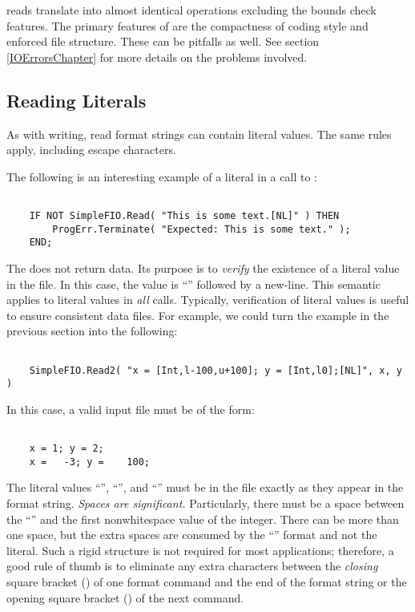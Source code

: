  reads translate into almost identical 
 operations excluding the bounds check features.
The primary features of  are the compactness of
coding style and enforced file structure.  These can be pitfalls as well.
See section \ref{IOErrorsChapter} for more details on the problems involved.

\subsection{Reading Literals}


As with writing, read format strings can contain literal values.
The same rules apply, including escape characters. 

The following is an interesting example of a literal in a call
to :
\begin{verbatim}

    IF NOT SimpleFIO.Read( "This is some text.[NL]" ) THEN
        ProgErr.Terminate( "Expected: This is some text." );
    END;

\end{verbatim}
The  does not return data.  Its purpose is to
{\em verify} the existence of a literal value in the file.  In
this case, the value is ``'' followed by
a new-line.  This semantic applies to literal values in {\em all}
 calls.  Typically, verification of literal values
is useful to ensure consistent data files.  For example, we could
turn the example in the previous section into the following:
\begin{verbatim}

    SimpleFIO.Read2( "x = [Int,l-100,u+100]; y = [Int,l0];[NL]", x, y )

\end{verbatim}
In this case, a valid input file must be of the form:
\begin{verbatim}

    x = 1; y = 2;
    x =   -3; y =    100;

\end{verbatim}
The literal values ``'', ``'', and ``\code{;}''
must be in the file exactly as they appear in the format string.
{\em Spaces are significant.}  Particularly, there must be a space
between the ``\code{=}'' and the first non\-white\-space value of the
integer.  There can be more than one space, but the extra spaces
are consumed by the ``\code{[Int]}'' format and not the literal.
Such a rigid structure is not required for most applications;
therefore, a good rule of thumb is to eliminate any extra characters
between the {\em closing} square bracket (\code{]}) of one format
command and the end of the format string or the opening square 
bracket (\code{[}) of the next command.


